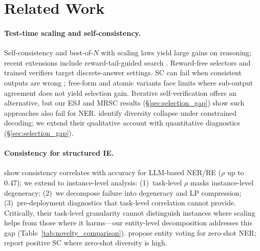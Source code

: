 \section{Related Work}\label{sec:related}

\paragraph{Test-time scaling and self-consistency.}\label{sec:yun_contrast}
Self-consistency \cite{wang2023selfconsistency} and best-of-$N$ with scaling laws \cite{snell2025scaling, brown2024monkeys, gao2023scaling} yield large gains on reasoning; recent extensions include reward-tail-guided search \cite{li2026rewardtail}. Reward-free selectors \cite{taubenfeld2025cisc, kang2025selfcertainty} and trained verifiers \cite{cobbe2021verifiers, lightman2024verify, li2023stepaware} target discrete-answer settings.
SC can fail when consistent outputs are wrong \cite{chen2023twofailures}; free-form \cite{chen2024usc} and atomic \cite{thirukovalluru2024atomic} variants face limits where sub-output agreement does not yield selection gain. Iterative self-verification \cite{shinn2023reflexion} offers an alternative, but our ESJ and MRSC results (\S\ref{sec:selection_gap}) show such approaches also fail for NER.
\citet{yun2025price} identify diversity collapse under constrained decoding; we extend their qualitative account with quantitative diagnostics (\S\ref{sec:selection_gap}).

\paragraph{Consistency for structured IE.}
\citet{yao2026consistency} show consistency correlates with accuracy for LLM-based NER/RE ($\rho$ up to 0.47); we extend to instance-level analysis: (1)~task-level $\rho$ masks instance-level degeneracy; (2)~we decompose failure into degeneracy and LP compression; (3)~pre-deployment diagnostics that task-level correlation cannot provide.
Critically, their task-level granularity cannot distinguish instances where scaling helps from those where it harms---our entity-level decomposition addresses this gap (Table~\ref{tab:novelty_comparison}).
\citet{xie2023zeroshot} propose entity voting for zero-shot NER; \citet{xie2024selfimproving} report positive SC where zero-shot diversity is high.

